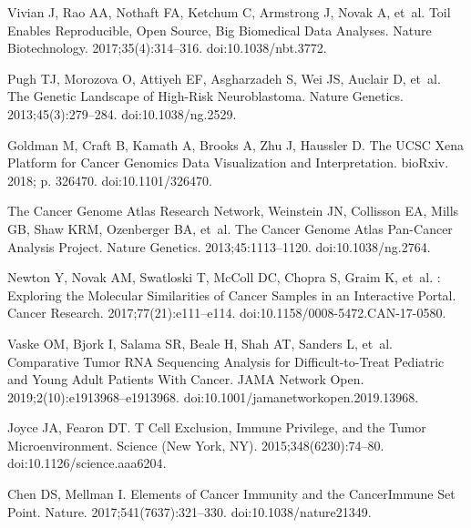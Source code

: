 \documentclass[10pt,letterpaper]{article}
\begin{document}
\begin{thebibliography}{10}
	Vivian J, Rao AA, Nothaft FA, Ketchum C, Armstrong J, Novak A, et~al.
	\newblock Toil Enables Reproducible, Open Source, Big Biomedical Data Analyses.
	\newblock Nature Biotechnology. 2017;35(4):314--316.
	\newblock doi:{10.1038/nbt.3772}.
	
	Pugh TJ, Morozova O, Attiyeh EF, Asgharzadeh S, Wei JS, Auclair D, et~al.
	\newblock The Genetic Landscape of High-Risk Neuroblastoma.
	\newblock Nature Genetics. 2013;45(3):279--284.
	\newblock doi:{10.1038/ng.2529}.
	
	Goldman M, Craft B, Kamath A, Brooks A, Zhu J, Haussler D.
	\newblock The {{UCSC Xena Platform}} for Cancer Genomics Data Visualization and
	Interpretation.
	\newblock bioRxiv. 2018; p. 326470.
	\newblock doi:{10.1101/326470}.
	
	{The Cancer Genome Atlas Research Network}, Weinstein JN, Collisson EA, Mills
	GB, Shaw KRM, Ozenberger BA, et~al.
	\newblock The {{Cancer Genome Atlas Pan}}-{{Cancer}} Analysis Project.
	\newblock Nature Genetics. 2013;45:1113--1120.
	\newblock doi:{10.1038/ng.2764}.
	
	Newton Y, Novak AM, Swatloski T, McColl DC, Chopra S, Graim K, et~al.
	: {{Exploring}} the {{Molecular Similarities}} of
	{{Cancer Samples}} in an {{Interactive Portal}}.
	\newblock Cancer Research. 2017;77(21):e111--e114.
	\newblock doi:{10.1158/0008-5472.CAN-17-0580}.
	
	Vaske OM, Bjork I, Salama SR, Beale H, Shah AT, Sanders L, et~al.
	\newblock Comparative {{Tumor RNA Sequencing Analysis}} for
	{{Difficult}}-to-{{Treat Pediatric}} and {{Young Adult Patients With
			Cancer}}.
	\newblock JAMA Network Open. 2019;2(10):e1913968--e1913968.
	\newblock doi:{10.1001/jamanetworkopen.2019.13968}.
	
	Joyce JA, Fearon DT.
	\newblock T Cell Exclusion, Immune Privilege, and the Tumor Microenvironment.
	\newblock Science (New York, NY). 2015;348(6230):74--80.
	\newblock doi:{10.1126/science.aaa6204}.
	
	Chen DS, Mellman I.
	\newblock Elements of Cancer Immunity and the Cancer\textendash{}Immune Set
	Point.
	\newblock Nature. 2017;541(7637):321--330.
	\newblock doi:{10.1038/nature21349}.
	

\end{thebibliography}
\end{document}

